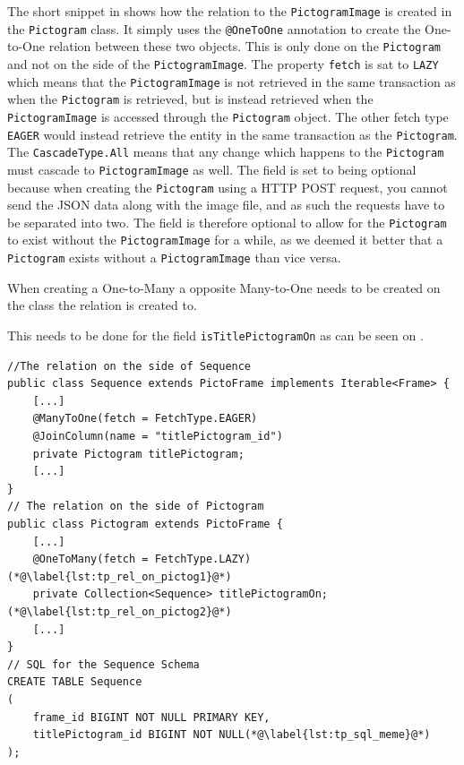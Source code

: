 The short snippet in  shows how the relation to the \texttt{PictogramImage} is created in the \texttt{Pictogram} class.
It simply uses the \texttt{@OneToOne} annotation to create the One-to-One relation between these two objects.
This is only done on the \texttt{Pictogram} and not on the side of the \texttt{PictogramImage}.
The property \texttt{fetch} is sat to \texttt{LAZY} which means that the \texttt{PictogramImage} is not retrieved in the same transaction as when the \texttt{Pictogram} is retrieved, but is instead retrieved when the \texttt{PictogramImage} is accessed through the \texttt{Pictogram} object.
The other fetch type \texttt{EAGER} would instead retrieve the entity in the same transaction as the \texttt{Pictogram}.
The \texttt{CascadeType.All} means that any change which happens to the \texttt{Pictogram} must cascade to \texttt{PictogramImage} as well.
The field is set to being optional because when creating the \texttt{Pictogram} using a HTTP POST request, you cannot send the JSON data along with the image file, and as such the requests have to be separated into two.
The field is therefore optional to allow for the \texttt{Pictogram} to exist without the \texttt{PictogramImage} for a while, as we deemed it better that a \texttt{Pictogram} exists without a \texttt{PictogramImage} than vice versa.

When creating a One-to-Many a opposite Many-to-One needs to be created on the class the relation is created to.

This needs to be done for the field \texttt{isTitlePictogramOn} as can be seen on .

\begin{lstlisting}[float, floatplacement=h, caption={Fields with annotations which causes Hibernate to perform the ORM for \texttt{titlePictogram}. \texttt{[...]} denotes omitted code.},label={lst:titlePictogram}]
//The relation on the side of Sequence
public class Sequence extends PictoFrame implements Iterable<Frame> {
	[...]
	@ManyToOne(fetch = FetchType.EAGER)
	@JoinColumn(name = "titlePictogram_id")
	private Pictogram titlePictogram;
	[...]
}
// The relation on the side of Pictogram
public class Pictogram extends PictoFrame {
	[...]
    @OneToMany(fetch = FetchType.LAZY)(*@\label{lst:tp_rel_on_pictog1}@*)
	private Collection<Sequence> titlePictogramOn;(*@\label{lst:tp_rel_on_pictog2}@*)
	[...]
}
// SQL for the Sequence Schema
CREATE TABLE Sequence
(
    frame_id BIGINT NOT NULL PRIMARY KEY,
    titlePictogram_id BIGINT NOT NULL(*@\label{lst:tp_sql_meme}@*)
);
\end{lstlisting}

